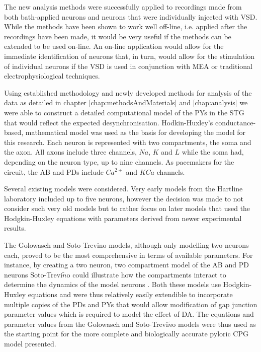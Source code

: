 The new analysis methods were successfully applied to recordings made from both bath-applied neurons and neurons that were individually injected with \ac{VSD}. While the methods have been shown to work well off-line, i.e. applied after the recordings have been made, it would be very useful if the methods can be extended to be used on-line. An on-line application would allow for the immediate identification of neurons that, in turn, would allow for the stimulation of individual neurons if the \ac{VSD} is used in conjunction with \ac{MEA} or traditional electrophysiological techniques.

Using established methodology and newly developed methods for analysis of the data as detailed in chapter \ref{chap:methodsAndMaterials} and \ref{chap:analysis} we were able to construct a detailed computational model of the \acp{PY} in the \ac{STG} that would reflect the expected desynchronisation. Hodkin-Huxley's conductance-based, mathematical model was used as the basis for developing the model for this research. Each neuron is represented with two compartments, the soma and the axon. All axons include three channels, $Na$, $K$ and $L$ while the soma had, depending on the neuron type, up to nine channels. As pacemakers for the circuit, the \ac{AB} and \acp{PD} include $Ca^{2+}$ and $KCa$ channels. 

Several existing models were considered. Very early models from the Hartline laboratory \cite{Hartline1979, Warshaw1976} included up to five neurons, however the decision was made to not consider such very old models but to rather focus on later models that used the Hodgkin-Huxley equations with parameters derived from newer experimental results.

The Golowasch \cite{Golowasch1999a} and Soto-Trevino \cite{Soto-Trevino2005} models, although only modelling two neurons each, proved to be the most comprehensive in terms of available parameters. For instance, by creating a two neuron, two compartment model of the \ac{AB} and \ac{PD} neurons Soto-Trevi$\tilde{n}$o could illustrate how the compartments interact to determine the dynamics of the model neurons \cite{Soto-Trevino2005}.  Both these models use Hodgkin-Huxley equations and were thus relatively easily extendible to incorporate multiple copies of the \acp{PD} and \acp{PY} that would allow modification of gap junction parameter values which is required to model the effect of \ac{DA}. The equations and parameter values from the Golowasch and Soto-Trevi$\tilde{n}$o models were thus used as the starting point for the more complete and biologically accurate pyloric \ac{CPG} model presented. 

